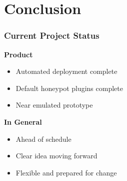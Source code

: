 \section{Conclusion}

\begin{frame}
\frametitle{Current Project Status}

\textbf{Product}
\begin{itemize}
\item Automated deployment complete
\item Default honeypot plugins complete
\item Near emulated prototype
\end{itemize}

\textbf{In General}
\begin{itemize}
\item Ahead of schedule
\item Clear idea moving forward
\item Flexible and prepared for change
\end{itemize}

\end{frame}

